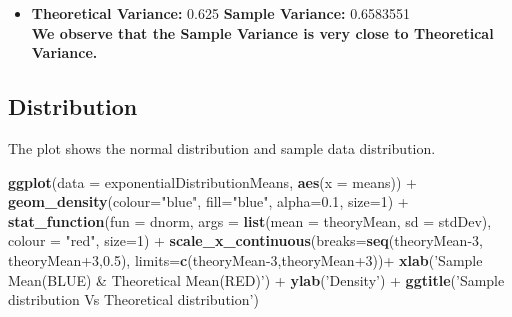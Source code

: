 \documentclass[]{article}
\newenvironment{Shaded}{\begin{snugshade}}{\end{snugshade}}
\newcommand{\KeywordTok}[1]{\textcolor[rgb]{0.13,0.29,0.53}{\textbf{{#1}}}}
\newcommand{\DataTypeTok}[1]{\textcolor[rgb]{0.13,0.29,0.53}{{#1}}}
\newcommand{\DecValTok}[1]{\textcolor[rgb]{0.00,0.00,0.81}{{#1}}}
\newcommand{\FloatTok}[1]{\textcolor[rgb]{0.00,0.00,0.81}{{#1}}}
\newcommand{\StringTok}[1]{\textcolor[rgb]{0.31,0.60,0.02}{{#1}}}
\newcommand{\NormalTok}[1]{{#1}}
\providecommand{\tightlist}{%
  \setlength{\itemsep}{0pt}\setlength{\parskip}{0pt}}
\begin{document}
\begin{Shaded}
\end{Shaded}

\begin{itemize}
\tightlist
\item
  \textbf{Theoretical Variance:} 0.625 \textbf{Sample Variance:}
  0.6583551\\
  \textbf{We observe that the Sample Variance is very close to
  Theoretical Variance.}
\end{itemize}

\subsection{Distribution}\label{distribution}

The plot shows the normal distribution and sample data distribution.

\begin{Shaded}
\begin{Highlighting}[]
\KeywordTok{ggplot}\NormalTok{(}\DataTypeTok{data =} \NormalTok{exponentialDistributionMeans, }\KeywordTok{aes}\NormalTok{(}\DataTypeTok{x =} \NormalTok{means)) +}\StringTok{ }
\StringTok{     }\KeywordTok{geom_density}\NormalTok{(}\DataTypeTok{colour=}\StringTok{"blue"}\NormalTok{, }\DataTypeTok{fill=}\StringTok{"blue"}\NormalTok{, }\DataTypeTok{alpha=}\FloatTok{0.1}\NormalTok{, }\DataTypeTok{size=}\DecValTok{1}\NormalTok{) +}
\StringTok{     }\KeywordTok{stat_function}\NormalTok{(}\DataTypeTok{fun =} \NormalTok{dnorm, }\DataTypeTok{args =} \KeywordTok{list}\NormalTok{(}\DataTypeTok{mean =} \NormalTok{theoryMean, }\DataTypeTok{sd =} \NormalTok{stdDev), }
                   \DataTypeTok{colour =} \StringTok{"red"}\NormalTok{, }\DataTypeTok{size=}\DecValTok{1}\NormalTok{) +}\StringTok{ }
\StringTok{     }\KeywordTok{scale_x_continuous}\NormalTok{(}\DataTypeTok{breaks=}\KeywordTok{seq}\NormalTok{(theoryMean}\DecValTok{-3}\NormalTok{, theoryMean}\DecValTok{+3}\NormalTok{,}\FloatTok{0.5}\NormalTok{),}
                        \DataTypeTok{limits=}\KeywordTok{c}\NormalTok{(theoryMean}\DecValTok{-3}\NormalTok{,theoryMean}\DecValTok{+3}\NormalTok{))+}
\StringTok{     }\KeywordTok{xlab}\NormalTok{(}\StringTok{'Sample Mean(BLUE) & Theoretical Mean(RED)'}\NormalTok{) +}\StringTok{ }\KeywordTok{ylab}\NormalTok{(}\StringTok{'Density'}\NormalTok{) +}
\StringTok{     }\KeywordTok{ggtitle}\NormalTok{(}\StringTok{'Sample distribution Vs Theoretical distribution'}\NormalTok{)}
\end{Highlighting}
\end{Shaded}
\end{document}
